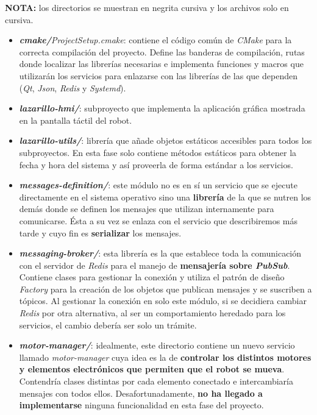 \textbf{NOTA:} los directorios se muestran en negrita cursiva y los archivos solo en cursiva.

\begin{itemize}
	\item \textit{\textbf{cmake/}ProjectSetup.cmake}: contiene el código común de \textit{CMake} para la correcta compilación del proyecto. Define las banderas de compilación, rutas donde localizar las librerías necesarias e implementa funciones y macros que utilizarán los servicios para enlazarse con las librerías de las que dependen (\textit{Qt}, \textit{Json}, \textit{Redis} y \textit{Systemd}).
	\item \textit{\textbf{lazarillo-hmi/}}: subproyecto que implementa la aplicación gráfica mostrada en la pantalla táctil del robot.
	\item \textit{\textbf{lazarillo-utils/}}: librería que añade objetos estáticos accesibles para todos los subproyectos. En esta fase solo contiene métodos estáticos para obtener la fecha y hora del sistema y así proveerla de forma estándar a los servicios.
	\item \textit{\textbf{messages-definition/}}: este módulo no es en sí un servicio que se ejecute directamente en el sistema operativo sino una \textbf{librería} de la que se nutren los demás donde se definen los mensajes que utilizan internamente para comunicarse. Ésta a su vez se enlaza con el servicio que describiremos más tarde y cuyo fin es \textbf{serializar} los mensajes.
	\item \textit{\textbf{messaging-broker/}}: esta librería es la que establece toda la comunicación con el servidor de \textit{Redis} para el manejo de \textbf{mensajería sobre \textit{PubSub}}. Contiene clases para gestionar la conexión y utiliza el patrón de diseño \textit{Factory} para la creación de los objetos que publican mensajes y se suscriben a tópicos. Al gestionar la conexión en solo este módulo, si se decidiera cambiar \textit{Redis} por otra alternativa, al ser un comportamiento heredado para los servicios, el cambio debería ser solo un trámite.
	\item \textit{\textbf{motor-manager/}}: idealmente, este directorio contiene un nuevo servicio llamado \textit{motor-manager} cuya idea es la de \textbf{controlar los distintos motores y elementos electrónicos que permiten que el robot se mueva}. Contendría clases distintas por cada elemento conectado e intercambiaría mensajes con todos ellos. Desafortunadamente, \textbf{no ha llegado a implementarse} ninguna funcionalidad en esta fase del proyecto.

\end{itemize}
